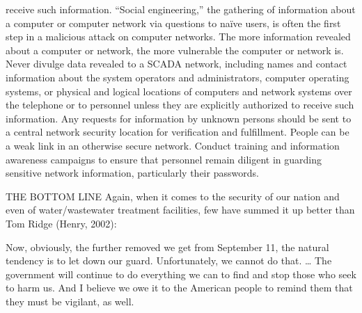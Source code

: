\documentclass{article}
\begin{document}
\begin{enumerate}
  receive such information. ``Social engineering,'' the gathering of
  information about a computer or computer network via questions to
  naïve users, is often the first step in a malicious attack on computer
  networks. The more information revealed about a computer or network,
  the more vulnerable the computer or network is. Never divulge data
  revealed to a SCADA network, including names and contact information
  about the system operators and administrators, computer operating
  systems, or physical and logical locations of computers and network
  systems over the telephone or to personnel unless they are explicitly
  authorized to receive such information. Any requests for information
  by unknown persons should be sent to a central network security
  location for verification and fulfillment. People can be a weak link
  in an otherwise secure network. Conduct training and information
  awareness campaigns to ensure that personnel remain diligent in
  guarding sensitive network information, particularly their passwords.
\end{enumerate}

THE BOTTOM LINE Again, when it comes to the security of our nation and
even of water/wastewater treatment facilities, few have summed it up
better than Tom Ridge (Henry, 2002):

Now, obviously, the further removed we get from September 11, the
natural tendency is to let down our guard. Unfortunately, we cannot do
that. \ldots{} The government will continue to do everything we can to
find and stop those who seek to harm us. And I believe we owe it to the
American people to remind them that they must be vigilant, as well.
\end{document}
